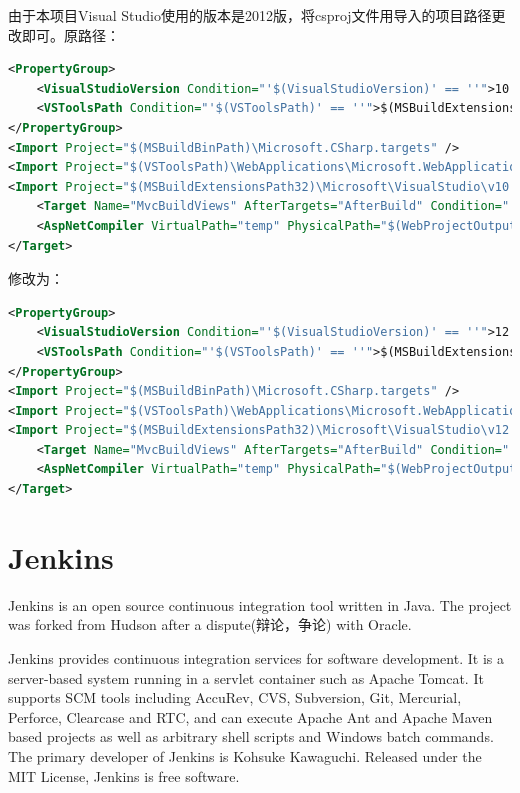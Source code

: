 \documentclass{book}
\begin{document}
由于本项目Visual Studio使用的版本是2012版，将csproj文件用导入的项目路径更改即可。原路径：

\begin{lstlisting}[language=XML]
<PropertyGroup>
	<VisualStudioVersion Condition="'$(VisualStudioVersion)' == ''">10.0</VisualStudioVersion>
	<VSToolsPath Condition="'$(VSToolsPath)' == ''">$(MSBuildExtensionsPath32)\Microsoft\VisualStudio\v$(VisualStudioVersion)</VSToolsPath>
</PropertyGroup>
<Import Project="$(MSBuildBinPath)\Microsoft.CSharp.targets" />
<Import Project="$(VSToolsPath)\WebApplications\Microsoft.WebApplication.targets" Condition="'$(VSToolsPath)' != ''" />
<Import Project="$(MSBuildExtensionsPath32)\Microsoft\VisualStudio\v10.0\WebApplications\Microsoft.WebApplication.targets" Condition="false" />
	<Target Name="MvcBuildViews" AfterTargets="AfterBuild" Condition="'$(MvcBuildViews)'=='true'">
	<AspNetCompiler VirtualPath="temp" PhysicalPath="$(WebProjectOutputDir)" />
</Target>
\end{lstlisting}

修改为：

\begin{lstlisting}[language=XML]
<PropertyGroup>
	<VisualStudioVersion Condition="'$(VisualStudioVersion)' == ''">12.0</VisualStudioVersion>
	<VSToolsPath Condition="'$(VSToolsPath)' == ''">$(MSBuildExtensionsPath32)\Microsoft\VisualStudio\v$(VisualStudioVersion)</VSToolsPath>
</PropertyGroup>
<Import Project="$(MSBuildBinPath)\Microsoft.CSharp.targets" />
<Import Project="$(VSToolsPath)\WebApplications\Microsoft.WebApplication.targets" Condition="'$(Solutions.VSVersion)' == '12.0'" />
<Import Project="$(MSBuildExtensionsPath32)\Microsoft\VisualStudio\v12.0\WebApplications\Microsoft.WebApplication.targets" Condition="'$(Solutions.VSVersion)' == '12.0'" />
	<Target Name="MvcBuildViews" AfterTargets="AfterBuild" Condition="'$(MvcBuildViews)'=='true'">
	<AspNetCompiler VirtualPath="temp" PhysicalPath="$(WebProjectOutputDir)" />
</Target>
\end{lstlisting}

\section{Jenkins}

Jenkins is an open source continuous integration tool written in Java. 
The project was forked from Hudson after a dispute(辩论，争论) with Oracle.

Jenkins provides continuous integration services for software development. 
It is a server-based system running in a servlet container such as Apache Tomcat. 
It supports SCM tools including AccuRev, CVS, Subversion, Git, Mercurial, Perforce, 
Clearcase and RTC, and can execute Apache Ant and Apache Maven based projects 
as well as arbitrary shell scripts and Windows batch commands. 
The primary developer of Jenkins is Kohsuke Kawaguchi.
Released under the MIT License, Jenkins is free software.
\end{document}

